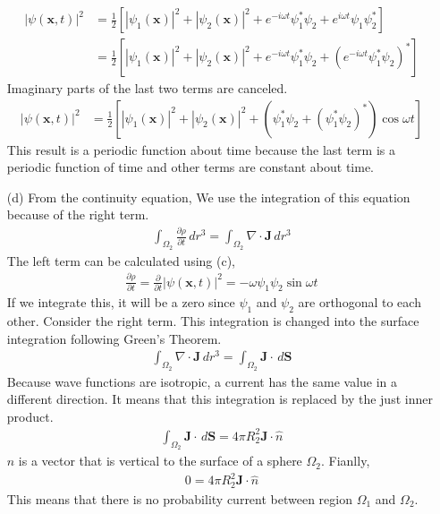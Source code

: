 \documentclass[aps,floatfix,nofootinbib,superscriptaddress,fleqn]{revtex4}
\begin{document}
\begin{itemize}
      \begin{align}
      |\psi(\bm{x},t)|^2 &= \frac{1}{2}\left[|\psi_1(\bm{x})|^2 + |\psi_2(\bm{x})|^2+e^{-i\omega t}\psi_1^*\psi_2+e^{i\omega t}\psi_1\psi_2^*  \right]
  \\                     &= \frac{1}{2}\left[ |\psi_1(\bm{x})|^2 + |\psi_2(\bm{x})|^2 + e^{-i\omega t}\psi_1^*\psi_2 + {\left(e^{-i\omega t}\psi_1^*\psi_2\right)}^* \right]
\end{align}
Imaginary parts of the last two terms are canceled.
\begin{align}  
  |\psi(\bm{x},t)|^2 &= \frac{1}{2}\left[ |\psi_1(\bm{x})|^2 + |\psi_2(\bm{x})|^2 + \left(\psi_1^*\psi_2 + {\left(\psi_1^*\psi_2\right)}^*\right)\cos{\omega t} \right]
\end{align}
This result is a periodic function about time because the last term is a periodic function of time and other terms are constant about time.
    \item[(d)]
From the continuity equation, We use the integration of this equation because of the right term.
\begin{align}
  \int_{\Omega_2}\frac{\partial \rho}{\partial t}\,dr^3 = \int_{\Omega_2}\nabla \cdot \bm{J}\,dr^3
\end{align}
The left term can be calculated using (c),
\begin{align}
  \frac{\partial\rho}{\partial t} = \frac{\partial}{\partial t}|\psi(\bm{x},t)|^2 = -\omega \psi_1\psi_2\sin\omega t
\end{align}
If we integrate this, it will be a zero since $\psi_1$ and $\psi_2$ are orthogonal to each other. Consider the right term. This integration is changed into the surface integration following Green's Theorem.
\begin{align}
  \int_{\Omega_2}\nabla \cdot \bm{J}\,dr^3 = \int_{\Omega_2} \bm{J} \cdot\,d\bm{S}
\end{align}
Because wave functions are isotropic, a current has the same value in a different direction. It means that this integration is replaced by the just inner product.
\begin{align}
  \int_{\Omega_2} \bm{J} \cdot\,d\bm{S} = 4\pi R_2^2\bm{J}\cdot\hat{n}
\end{align}
$\hat{n}$ is a vector that is vertical to the surface of a sphere $\Omega_2$. Fianlly,
\begin{align}
  0 = 4\pi R_2^2\bm{J}\cdot\hat{n}
\end{align}
This means that there is no probability current between region $\Omega_1$ and $\Omega_2$.
  \end{itemize}
\end{document}

